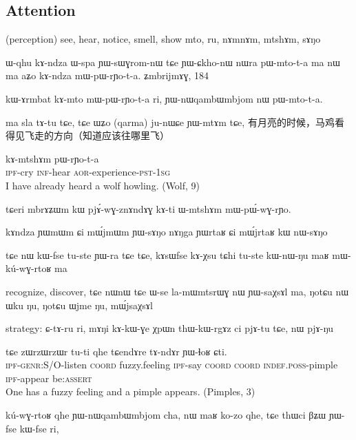 \documentclass[oldfontcommands,oneside,a4paper,11pt]{article}
\newcommand{\ipa}[1]{{\phon #1}} %
\begin{document}
\subsection{Attention} 
 (perception)
 see, hear, notice, smell, show 
\ipa{mto}, \ipa{ru}, \ipa{nɤmnɤm}, \ipa{mtshɤm}, \ipa{sɤŋo}


ɯ-qhu kɤ-ndza ɯ-spa ɲɯ-sɯɣrom-nɯ tɕe ɲɯ-ɕkho-nɯ nɯra pɯ-mto-t-a ma
nɯ ma aʑo kɤ-ndza mɯ-pɯ-rɲo-t-a.
ʑmbrijmɤɣ, 184

kɯ-ɤrmbat kɤ-mto mɯ-pɯ-rɲo-t-a ri,
ɲɯ-nɯqambɯmbjom nɯ pɯ-mto-t-a.

ma sla tɤ-tu tɕe, tɕe ɯʑo (qarma) ju-nɯɕe ɲɯ-mtɤm tɕe, 
有月亮的时候，马鸡看得见飞走的方向（知道应该往哪里飞）

		 \begin{exe}
\ex \label{ex:mtsham2}
 \gll   	\ipa{tu-ɣɤwu}    	\ipa{ kɤ-mtshɤm}   	\ipa{pɯ-rɲo-t-a}     	 \\
 \textsc{ipf}-cry   \textsc{inf}-hear \textsc{aor}-experience-\textsc{pst}-\textsc{1sg} \\
 \glt I have already heard a wolf howling. (Wolf, 9)
\end{exe} 
 		

tɕeri mbrɤʑɯm kɯ pjɤ́-wɣ-znɤndɤɣ kɤ-ti ɯ-mtshɤm mɯ-pɯ́-wɣ-rɲo. 

 kɤndza ɲɯmɯm ɕi mɯ́jmɯm ɲɯ-sɤŋo
 nɤŋga ɲɯrtaʁ ɕi mɯ́jrtaʁ kɯ nɯ-sɤŋo
 
 
tɕe nɯ kɯ-fse tu-ste ɲɯ-ra tɕe tɕe,
kɤsɯfse kɤ-χsu tɕhi tu-ste kɯ-nɯ-ŋu maʁ mɯ-kú-wɣ-rtoʁ ma  
 
recognize, discover,  
tɕe nɯnɯ tɕe ɯ-se la-mɯmtsrɯɣ nɯ ɲɯ-saχsɤl ma,
ŋotɕu nɯ ɯku ŋu, ŋotɕu ɯjme ŋu, mɯ́jsaχsɤl

strategy:
ɕ-tɤ-ru ri,
mɤŋi kɤ-kɯ-ɣe χpɯn thɯ-kɯ-rgɤz ci pjɤ-tu tɕe, nɯ pjɤ-ŋu

		 \begin{exe}
\ex \label{ex:sANo3}
\gll \ipa{ɲɯ-kɯ-sɤŋo}   	\ipa{tɕe}   	\ipa{zɯrzɯrzɯr}   	\ipa{tu-ti}   	\ipa{qhe}   	\ipa{tɕendɤre}   	\ipa{tɤ-ndɤr}   	\ipa{ɲɯ-ɬoʁ}   	\ipa{ɕti.}\\
\textsc{ipf-genr:S/O}-listen \textsc{coord}  fuzzy.feeling \textsc{ipf}-say \textsc{coord} \textsc{coord} \textsc{indef.poss}-pimple \textsc{ipf}-appear be:\textsc{assert} \\
 \glt  One has a fuzzy feeling and a pimple  appears. (Pimples, 3)
\end{exe} 
  	
  	kú-wɣ-rtoʁ qhe ɲɯ-nɯqambɯmbjom cha,
nɯ maʁ ko-zo qhe, tɕe thɯci βʑɯ ɲɯ-fse kɯ-fse ri,
\end{document}
